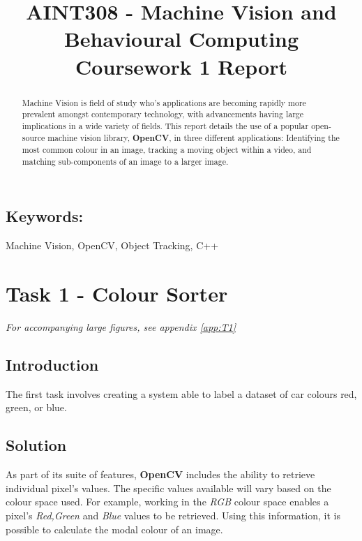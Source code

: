 \documentclass[conference]{IEEEtran}
\begin{document}
%
\title{AINT308 - Machine Vision and Behavioural Computing\\Coursework 1 Report}


\author{
}



\maketitle


\begin{abstract}
 Machine Vision is field of study who's applications are becoming rapidly more prevalent amongst contemporary technology, with advancements having large implications in a wide variety of fields. This report details the use of a popular open-source machine vision library, \textbf{OpenCV}, in three different applications: Identifying the most common colour in an image, tracking a moving object within a video, and matching sub-components of an image to a larger image.
\end{abstract}
\subsection*{Keywords:}
Machine Vision, OpenCV, Object Tracking, C++

\section{Task 1 - Colour Sorter}
\textit{For accompanying large figures, see appendix \ref{app:T1}}
\subsection{Introduction}
The first task involves creating a system able to label a dataset of car colours red, green, or blue.
\subsection{Solution}
As part of its suite of features, \textbf{OpenCV} includes the ability to retrieve individual pixel's values. The specific values available will vary based on the colour space used. For example, working in the \textit{RGB} colour space enables a pixel's \textit{Red,Green} and \textit{Blue} values to be retrieved. Using this information, it is possible to calculate the modal colour of an image. 
\end{document}

